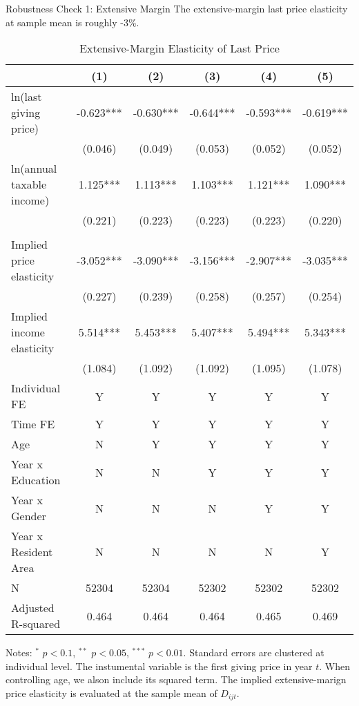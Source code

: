 \documentclass[
  ignorenonframetext,
  aspectratio=169,
]{beamer}
\begin{document}
\begin{frame}{Robustness Check 1: Extensive Margin}
\protect\hypertarget{robustness-check-1-extensive-margin}{}
The extensive-margin last price elasticity at sample mean is roughly -3\%.

\begin{table}

\caption{\label{tab:LastExtensive}Extensive-Margin Elasticity of Last Price}
\centering
\fontsize{7}{9}\selectfont
\begin{threeparttable}
\begin{tabular}[t]{lccccc}
\toprule
 & (1) & (2) & (3) & (4) & (5)\\
\midrule
ln(last giving price) & -0.623*** & -0.630*** & -0.644*** & -0.593*** & -0.619***\\
 & (0.046) & (0.049) & (0.053) & (0.052) & (0.052)\\
ln(annual taxable income) & 1.125*** & 1.113*** & 1.103*** & 1.121*** & 1.090***\\
 & (0.221) & (0.223) & (0.223) & (0.223) & (0.220)\\
 &  &  &  &  & \\
Implied price elasticity & -3.052*** & -3.090*** & -3.156*** & -2.907*** & -3.035***\\
 & (0.227) & (0.239) & (0.258) & (0.257) & (0.254)\\
Implied income elasticity & 5.514*** & 5.453*** & 5.407*** & 5.494*** & 5.343***\\
 & (1.084) & (1.092) & (1.092) & (1.095) & (1.078)\\
Individual FE & Y & Y & Y & Y & Y\\
Time FE & Y & Y & Y & Y & Y\\
Age & N & Y & Y & Y & Y\\
Year x Education & N & N & Y & Y & Y\\
Year x Gender & N & N & N & Y & Y\\
Year x Resident Area & N & N & N & N & Y\\
N & 52304 & 52304 & 52302 & 52302 & 52302\\
Adjusted R-squared & 0.464 & 0.464 & 0.464 & 0.465 & 0.469\\
\bottomrule
\end{tabular}
\begin{tablenotes}
\item Notes: $^{*}$ $p < 0.1$, $^{**}$ $p < 0.05$, $^{***}$ $p < 0.01$. Standard errors are clustered at individual level. The instumental variable is the first giving price in year $t$. When controlling age, we alson include its squared term. The implied extensive-marign price elasticity is evaluated at the sample mean of $D_{ijt}$.
\end{tablenotes}
\end{threeparttable}
\end{table}
\end{frame}
\end{document}
